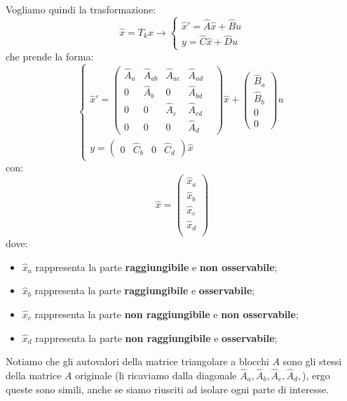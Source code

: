 \documentclass[a4paper,11pt]{article}
\begin{document}
Vogliamo quindi la trasformazione:
$$
\hat{x} = T_k x \rightarrow
\begin{cases}
	\hat{x}' = \hat{A} \hat{x} + \hat{B} u \\
	y = \hat{C} \hat{x} + \hat{D} u
\end{cases}
$$
che prende la forma:
\[
	\begin{cases}			
\hat{x}' = \begin{pmatrix}
	\hat{A}_a & \hat{A}_{ab} & \hat{A}_{ac} & \hat{A}_{ad} & \\
	0 & \hat{A}_b & 0 & \hat{A}_{bd} & \\
	0 & 0 & \hat{A}_c & \hat{A}_{cd} \\ 
	0 & 0 & 0 & \hat{A}_d
\end{pmatrix} \hat{x} + \begin{pmatrix}
	\hat{B}_a \\ \hat{B}_b \\ 0 \\ 0
\end{pmatrix} u \\
y = \begin{pmatrix}
	0 & \hat{C}_b & 0 & \hat{C}_d
\end{pmatrix} \hat{x}
	\end{cases}
\]
con:
$$
\hat{x} = \begin{pmatrix}
	\hat{x}_a \\ 
	\hat{x}_b \\ 
	\hat{x}_c \\ 
	\hat{x}_d \\ 
\end{pmatrix}
$$
dove:
\begin{itemize}
	\item $\hat{x}_a$ rappresenta la parte \textbf{raggiungibile} e \textbf{non osservabile}; 
	\item $\hat{x}_b$ rappresenta la parte \textbf{raggiungibile} e \textbf{osservabile}; 
	\item $\hat{x}_c$ rappresenta la parte \textbf{non raggiungibile} e \textbf{non osservabile}; 
	\item $\hat{x}_d$ rappresenta la parte \textbf{non raggiungibile} e \textbf{osservabile}; 
\end{itemize}

Notiamo che gli autovalori della matrice triangolare a blocchi $A$ sono gli stessi della matrice $A$ originale (li ricaviamo dalla diagonale $\hat{A}_a, \hat{A}_b, \hat{A}_c, \hat{A}_d,$), ergo queste sono simili, anche se siamo riusciti ad isolare ogni parte di interesse.
\end{document}
